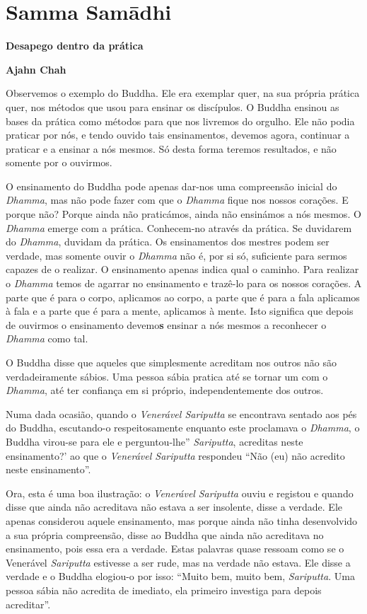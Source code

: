 \chapter{Samma Samādhi}

\textbf{Desapego dentro da prática}

\textbf{Ajahn Chah}

Observemos o exemplo do Buddha. Ele era exemplar quer, na sua própria
prática quer, nos métodos que usou para ensinar os discípulos. O Buddha
ensinou as bases da prática como métodos para que nos livremos do
orgulho. Ele não podia praticar por nós, e tendo ouvido tais
ensinamentos, devemos agora, continuar a praticar e a ensinar a nós
mesmos. Só desta forma teremos resultados, e não somente por o ouvirmos.

O ensinamento do Buddha pode apenas dar-nos uma compreensão inicial do
\emph{Dhamma}, mas não pode fazer com que o \emph{Dhamma} fique nos
nossos corações. E porque não? Porque ainda não praticámos, ainda não
ensinámos a nós mesmos. O \emph{Dhamma} emerge com a prática.
Conhecem-no através da prática. Se duvidarem do \emph{Dhamma}, duvidam
da prática. Os ensinamentos dos mestres podem ser verdade, mas somente
ouvir o \emph{Dhamma} não é, por si só, suficiente para sermos capazes
de o realizar. O ensinamento apenas indica qual o caminho. Para realizar
o \emph{Dhamma} temos de agarrar no ensinamento e trazê-lo para os
nossos corações. A parte que é para o corpo, aplicamos ao corpo, a parte
que é para a fala aplicamos à fala e a parte que é para a mente,
aplicamos à mente. Isto significa que depois de ouvirmos o ensinamento
devemo\textbf{s} ensinar a nós mesmos a reconhecer o \emph{Dhamma} como
tal.

O Buddha disse que aqueles que simplesmente acreditam nos outros não são
verdadeiramente sábios. Uma pessoa sábia pratica até se tornar um com o
\emph{Dhamma}, até ter confiança em si próprio, independentemente dos
outros.

Numa dada ocasião, quando o \emph{Venerável Sariputta} se encontrava
sentado aos pés do Buddha, escutando-o respeitosamente enquanto este
proclamava o \emph{Dhamma}, o Buddha virou-se para ele e perguntou-lhe''
\emph{Sariputta}, acreditas neste ensinamento?' ao que o \emph{Venerável
Sariputta} respondeu ``Não (eu) não acredito neste ensinamento''.

Ora, esta é uma boa ilustração: o \emph{Venerável} \emph{Sariputta}
ouviu e registou e quando disse que ainda não acreditava não estava a
ser insolente, disse a verdade. Ele apenas considerou aquele
ensinamento, mas porque ainda não tinha desenvolvido a sua própria
compreensão, disse ao Buddha que ainda não acreditava no ensinamento,
pois essa era a verdade. Estas palavras quase ressoam como se o
Venerável \emph{Sariputta} estivesse a ser rude, mas na verdade não
estava. Ele disse a verdade e o Buddha elogiou-o por isso: ``Muito bem,
muito bem, \emph{Sariputta}. Uma pessoa sábia não acredita de imediato,
ela primeiro investiga para depois acreditar''.

